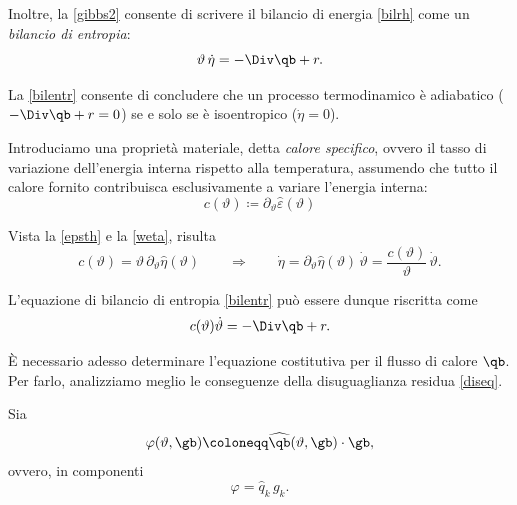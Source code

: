 Inoltre, la \eqref{gibbs2} consente di scrivere il bilancio di energia \eqref{bilrh} come un \textit{bilancio di entropia}:
\begin{equation}\label{bilentr}
\vartheta\,\dot{\eta}=-\Div \qb +r.
\end{equation}

La \eqref{bilentr} consente di concludere che un processo termodinamico è adiabatico ($-\Div \qb +r=0$) se e solo se è isoentropico ($\dot{\eta}=0$).


Introduciamo una proprietà materiale, detta \textit{calore specifico},  ovvero il tasso di variazione dell'energia interna rispetto alla temperatura, assumendo che tutto il calore fornito contribuisca esclusivamente a variare l'energia interna:
\begin{equation}
c(\vartheta)\coloneqq \partial_\vartheta \widehat{\varepsilon}(\vartheta)
\end{equation}

Vista la \eqref{epsth} e la \eqref{weta}, risulta 
\begin{equation}
c(\vartheta)=\vartheta\,\partial_\vartheta\widehat{\eta}(\vartheta) \qquad\Longrightarrow \qquad \dot{\eta}=\partial_\vartheta\widehat{\eta}(\vartheta)\, \dot\vartheta=\frac{c(\vartheta)}{\vartheta}\, \dot{\vartheta}.
\end{equation}

L'equazione di bilancio di entropia \eqref{bilentr} può essere dunque riscritta come
\begin{equation}\label{bilentr1}
c(\vartheta)\dot{\vartheta}=-\Div \qb + r.
\end{equation}

È necessario adesso determinare l'equazione costitutiva per il flusso di calore $\qb$. Per farlo, analizziamo meglio le conseguenze della disuguaglianza residua
\eqref{diseq}.

Sia
\begin{equation}\label{varphi}
\varphi(\vartheta, \gb)\coloneqq \widehat{\qb}(\vartheta, \gb)\cdot \gb,
\end{equation}
ovvero, in componenti
\begin{equation}\label{varcomp}
\varphi=\widehat{q}_k \,g_k.
\end{equation}

